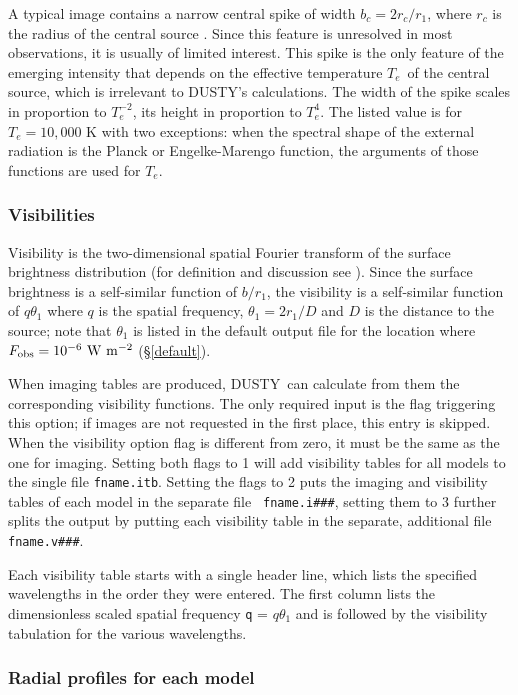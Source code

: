 \documentclass[12pt]{article} \usepackage{epsf}
\def\D  {{\sf DUSTY}}
\def\E#1{\hbox{$10^{#1}$}}
\def\Te   {\hbox{$T_e$}}
\begin{document}
A typical image contains a narrow central spike of width $b_c = 2r_c/r_1$,
where $r_c$ is the radius of the central source \cite{IE96a}.  Since this
feature is unresolved in most observations, it is usually of limited interest.
This spike is the only feature of the emerging intensity that depends on the
effective temperature \Te\ of the central source, which is irrelevant to \D's
calculations. The width of the spike scales in proportion to $T_e^{-2}$, its
height in proportion to $T_e^4$. The listed value is for $T_e = 10,000$ K with
two exceptions: when the spectral shape of the external radiation is the Planck
or Engelke-Marengo function, the arguments of those functions are used for
$T_e$.

\subsubsection{Visibilities}
\label{fname.v}

Visibility is the two-dimensional spatial Fourier transform of the surface
brightness distribution (for definition and discussion see \cite{IE96a}). Since
the surface brightness is a self-similar function of $b/r_1$, the visibility is
a self-similar function of $q\theta_1$ where $q$ is the spatial frequency,
$\theta_1 = 2r_1/D$ and $D$ is the distance to the source; note that $\theta_1$
is listed in the default output file for the location where $F_{\rm obs} =
\E{-6}\ \rm W\ m^{-2}$ (\S\ref{default}).

When imaging tables are produced, \D\ can calculate from them the corresponding
visibility functions. The only required input is the flag triggering this
option; if images are not requested in the first place, this entry is skipped.
When the visibility option flag is different from zero, it must be the same as
the one for imaging. Setting both flags to 1 will add visibility tables for all
models to the single file {\tt fname.itb}. Setting the flags to 2 puts the
imaging and visibility tables of each model in the separate file {\tt
fname.i\#\#\#}, setting them to 3 further splits the output by putting each
visibility table in the separate, additional file {\tt fname.v\#\#\#}.

Each visibility table starts with a single header line, which lists the
specified wavelengths in the order they were entered. The first column lists
the dimensionless scaled spatial frequency {\tt q} = $q\theta_1$ and is
followed by the visibility tabulation for the various wavelengths.


\subsubsection{Radial profiles for each model}
\label{fname.r}
\end{document}
